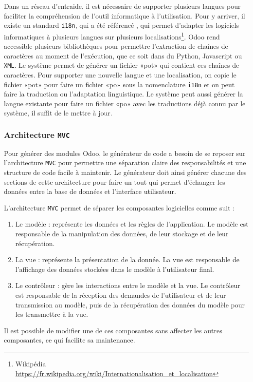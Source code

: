 Dans un réseau d'entraide, il est nécessaire de supporter plusieurs langues pour faciliter la compréhension de l'outil informatique à l'utilisation. Pour y arriver, il existe un standard \texttt{i18n}, qui a été référencé \cite{i18n_wiley}, qui permet d'adapter les logiciels informatiques à plusieurs langues sur plusieurs localisations\footnote{Wikipédia \url{https://fr.wikipedia.org/wiki/Internationalisation_et_localisation}}. Odoo rend accessible plusieurs bibliothèques pour permettre l’extraction de chaînes de caractères au moment de l’exécution, que ce soit dans du Python, Javascript ou \texttt{XML}. Le système permet de générer un fichier «pot» qui contient ces chaînes de caractères. Pour supporter une nouvelle langue et une localisation, on copie le fichier «pot» pour faire un fichier «po» sous la nomenclature \texttt{i18n} et on peut faire la traduction ou l’adaptation linguistique. Le système peut aussi générer la langue existante pour faire un fichier «po» avec les traductions déjà connu par le système, il suffit de le mettre à jour.

\subsubsection{Architecture \texttt{MVC}}

Pour générer des modules Odoo, le générateur de code a besoin de se reposer sur l'architecture \texttt{MVC} pour permettre une séparation claire des responsabilités et une structure de code facile à maintenir. Le générateur doit ainsi générer chacune des sections de cette architecture pour faire un tout qui permet d'échanger les données entre la base de données et l'interface utilisateur.

L’architecture \texttt{MVC} permet de séparer les composantes logicielles comme suit : 
\begin{enumerate}
    \item Le modèle : représente les données et les règles de l’application. Le modèle est responsable de la manipulation des données, de leur stockage et de leur récupération.
    \item La vue : représente la présentation de la donnée. La vue est responsable de l’affichage des données stockées dans le modèle à l’utilisateur final.
    \item Le contrôleur : gère les interactions entre le modèle et la vue. Le contrôleur est responsable de la réception des demandes de l’utilisateur et de leur transmission au modèle, puis de la récupération des données du modèle pour les transmettre à la vue.
\end{enumerate}
Il est possible de modifier une de ces composantes sans affecter les autres composantes, ce qui facilite sa maintenance.

